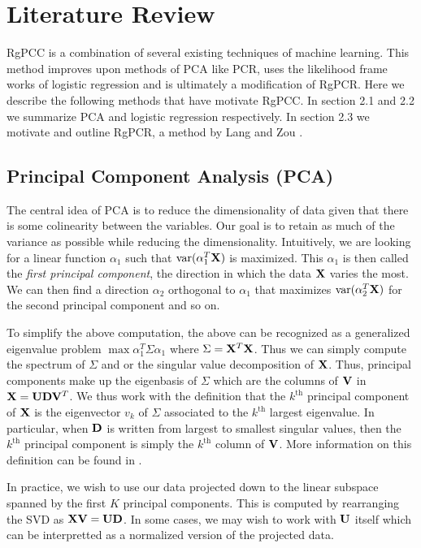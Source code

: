 \documentclass[main.tex]{subfiles}
\begin{document}
\section{Literature Review}
RgPCC is a combination of several existing techniques of machine learning. This method improves upon methods of PCA like PCR, uses the likelihood frame works of logistic regression and is ultimately a modification of RgPCR. Here we describe the following methods that have motivate RgPCC. In section 2.1 and 2.2 we summarize PCA and logistic regression respectively. In section 2.3 we motivate and outline RgPCR, a method by Lang and Zou \citep{langzou}.

%
%
%
%
%
%
%
%
%
%
%

\subsection{Principal Component Analysis (PCA)}
The central idea of PCA is to reduce the dimensionality of data given that there is some colinearity between the variables. Our goal is to retain as much of the variance as possible while reducing the dimensionality. Intuitively, we are looking for a linear function $\alpha_1$ such that $\text{var}(\alpha_1^T \mathbf{X})$ is maximized. This $\alpha_1$ is then called the \emph{first principal component}, the direction in which the data $\mathbf{X}$ varies the most. We can then find a direction $\alpha_2$ orthogonal to $\alpha_1$ that maximizes $\text{var}(\alpha^T_2 \mathbf{X})$ for the second principal component and so on. 

To simplify the above computation, the above can be recognized as a generalized eigenvalue problem $\max \alpha_1^T \Sigma \alpha_1$ where $\Sigma = \mathbf{X}^T \mathbf{X}$. Thus we can simply compute the spectrum of $\Sigma$ and or the singular value decomposition of $\mathbf{X}$. Thus, principal components make up the eigenbasis of $\Sigma$ which are the columns of $\mathbf{V}$ in $\mathbf{X} = \mathbf{U} \mathbf{D} \mathbf{V}^T$. We thus work with the definition that the $k^{\text{th}}$ principal component of $\mathbf{X}$ is the eigenvector $v_k$ of $\Sigma$ associated to the $k^{\text{th}}$ largest eigenvalue. In particular, when $\mathbf{D}$ is written from largest to smallest singular values, then the $k^{\text{th}}$ principal component is simply the $k^{\text{th}}$ column of $\mathbf{V}$. More information on this definition can be found in \cite{PCA}.

In practice, we wish to use our data projected down to the linear subspace spanned by the first $K$ principal components. This is computed by rearranging the SVD as $\mathbf{X} \mathbf{V} = \mathbf{U} \mathbf{D}$. In some cases, we may wish to work with $\mathbf{U}$ itself which can be interpretted as a normalized version of the projected data.
\end{document}
